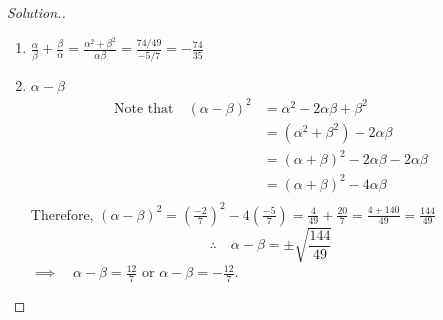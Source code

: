\documentclass[11pt,a4paper]{article}
\theoremstyle{definition}
\newenvironment{solution}
  {\renewcommand{\qedsymbol}{}\begin{proof}[\textit{Solution}.]}
  {\end{proof}}
\begin{document}
\begin{solution}
\begin{enumerate}
\begin{enumerate}
$\therefore \quad  \alpha^2+\beta^2=\frac{74}{49}$\\
\item $\frac{\alpha}{\beta}+\frac{\beta}{\alpha}=\frac{\alpha^2+\beta^2}{\alpha \beta}=\frac{74/49}{-5/7}=-\frac{74}{35}$\\
\item $\alpha-\beta$
\begin{align*}
\text{Note that}\quad  (\alpha-\beta)^2 & = \alpha^2-2\alpha \beta +\beta^2\\
                                                & = (\alpha^2+\beta^2)-2\alpha \beta\\
                                                & = (\alpha + \beta)^2-2\alpha \beta -2\alpha \beta\\
                                                & = (\alpha + \beta)^2-4\alpha \beta\\
\end{align*}
Therefore, $(\alpha-\beta)^2=\left(\frac{-2}{7}\right)^2-4\left(\frac{-5}{7}\right)=\frac{4}{49}+\frac{20}{7}=\frac{4+140}{49}=\frac{144}{49}$
$$\therefore\quad  \alpha -\beta =\pm \sqrt{\frac{144}{49}}$$
$\implies\quad  \alpha-\beta=\frac{12}{7}$ or $\alpha-\beta=-\frac{12}{7}$.\\
\end{enumerate}
\end{enumerate}
\end{solution}
\end{document}
